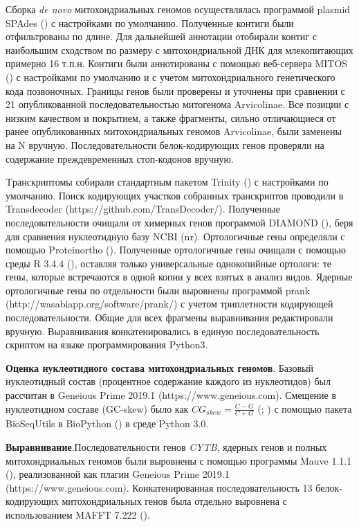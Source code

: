 Сборка \textit{de novo} митохондриальных геномов осуществлялась программой plasmid SPAdes (\cite{Bankevich2012}) с настройками по умолчанию. Полученные контиги были отфильтрованы по длине. Для дальнейшей аннотации отобирали контиг с наибольшим сходством по размеру с митохондриальной ДНК для млекопитающих примерно 16 т.п.н. Контиги были аннотированы с помощью веб-сервера MITOS (\cite{Bernt2013}) с настройками по умолчанию и с учетом митохондриального генетического кода позвоночных. Границы генов были проверены и уточнены при сравнении с 21 опубликованной последовательностью митогенома Arvicolinae. Все позиции с низким качеством и покрытием, а также фрагменты, сильно отличающиеся от ранее опубликованных митохондриальных геномов Arvicolinae, были заменены на N вручную. Последовательности белок-кодирующих генов проверяли на содержание преждевременных стоп-кодонов вручную.

Tранскриптомы собирали стандартным пакетом Trinity (\cite{Grabherr2011}) с настройками по умолчанию. Поиск кодирующих участков собранных транскриптов проводили в Transdecoder (https://github.com/TransDecoder/). Полученные последовательности очищали от химерных генов программой DIAMOND (\cite{Buchfink2015}), беря для сравнения нуклеотидную базу NCBI (nr). Ортологичные гены определяли с помощью Proteinortho (\cite{Lechner2011}). Полученные ортологичные гены очищали с помощью среды R 3.4.4 (\cite{RCoreTeam2017}), оставляя только универсальные однокопийные ортологи: те гены, которые встречаются в одной копии у всех взятых в анализ видов. Ядерные ортологичные гены по отдельности были выровнены программой prank (http://wasabiapp.org/software/prank/) с учетом триплетности кодирующей последовательности. Общие для всех фрагмены выравнивания редактировали вручную. Выравнивания конкатенировались в единую последовательность скриптом на языке программирования Python3.

\textbf{Оценка нуклеотидного состава митохондриальных геномов}. Базовый нуклеотидный состав (процентное содержание каждого из нуклеотидов) был рассчитан в Geneious Prime 2019.1 (https://www.geneious.com). Смещение в нуклеотидном составе (GC-skew) было как $CG_{skew} = \frac{C - G}{C + G}$ (\cite{Arabi2010}; \cite{Hassanin2005}) с помощью пакета BioSeqUtils в BioPython (\cite{Cock2009}) в среде Python 3.0. 

\textbf{Выравнивание}.Последовательности генов \textit{CYTB}, ядерных генов и полных митохондриальных геномов были выровнены с помощью программы Mauve 1.1.1 (\cite{Darling2004}), реализованной как плагин Geneious Prime 2019.1 (https://www.geneious.com). Конкатенированная последовательность 13 белок-кодирующих митохондриальных генов была отдельно выровнена с использованием MAFFT 7.222 (\cite{Katoh2014}).

